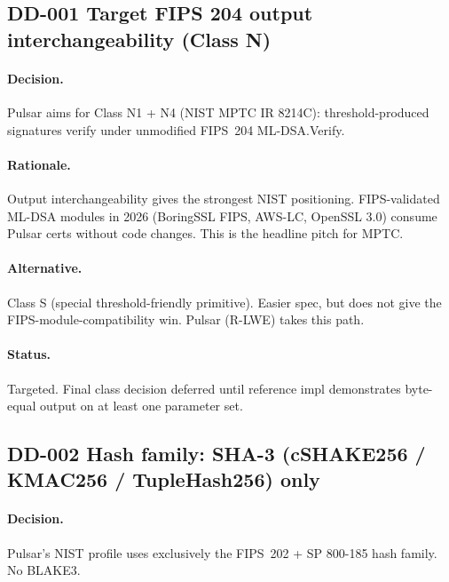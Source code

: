 
\subsection{DD-001 Target FIPS 204 output interchangeability (Class
N)}

\paragraph{Decision.}
Pulsar aims for Class N1 + N4 (NIST MPTC IR 8214C):
threshold-produced signatures verify under unmodified FIPS~204
ML-DSA.Verify.

\paragraph{Rationale.}
Output interchangeability gives the strongest NIST positioning.
FIPS-validated ML-DSA modules in 2026 (BoringSSL FIPS, AWS-LC,
OpenSSL 3.0) consume Pulsar certs without code changes. This is
the headline pitch for MPTC.

\paragraph{Alternative.}
Class S (special threshold-friendly primitive). Easier spec, but
does not give the FIPS-module-compatibility win. Pulsar (R-LWE)
takes this path.

\paragraph{Status.}
Targeted. Final class decision deferred until reference impl
demonstrates byte-equal output on at least one parameter set.

\subsection{DD-002 Hash family: SHA-3 (cSHAKE256 / KMAC256 /
TupleHash256) only}

\paragraph{Decision.}
Pulsar's NIST profile uses exclusively the FIPS~202 + SP 800-185
hash family. No BLAKE3.

